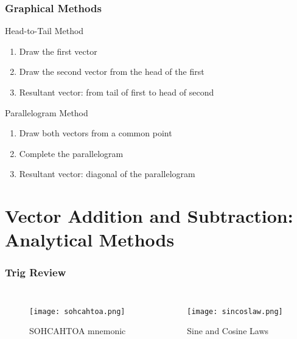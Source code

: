 \documentclass{beamer}
\begin{document}
\begin{frame}
\frametitle{Graphical Methods}
\begin{block}{Head-to-Tail Method}
\begin{enumerate}
\item Draw the first vector
\item Draw the second vector from the head of the first
\item Resultant vector: from tail of first to head of second
\end{enumerate}
\end{block}

\begin{block}{Parallelogram Method}
\begin{enumerate}
\item Draw both vectors from a common point
\item Complete the parallelogram
\item Resultant vector: diagonal of the parallelogram
\end{enumerate}
\end{block}
\end{frame}

\section{Vector Addition and Subtraction: Analytical Methods}

\begin{frame}
\frametitle{Trig Review}
\begin{columns}[T] %
    \begin{figure}
        \centering
        \texttt{[image: sohcahtoa.png]}
        \caption{SOHCAHTOA mnemonic}
    \end{figure}

    \begin{figure}
        \centering
        \texttt{[image: sincoslaw.png]}
        \caption{Sine and Cosine Laws}
    \end{figure}
\end{columns}
\end{frame}
\end{document}
